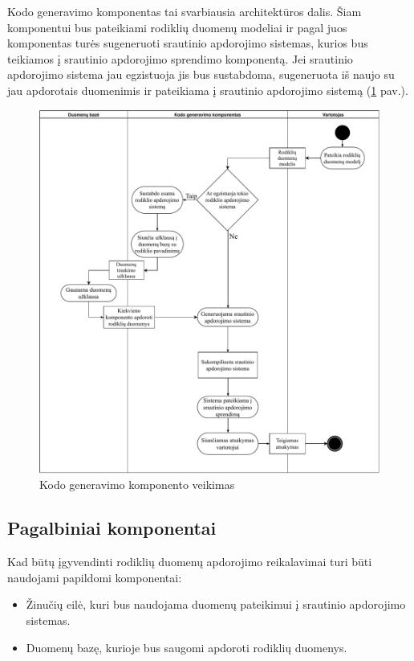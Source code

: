 \documentclass{VUMIFPSbakalaurinis}
\begin{document}
Kodo generavimo komponentas tai svarbiausia architektūros dalis. Šiam komponentui bus pateikiami rodiklių duomenų modeliai ir pagal juos komponentas turės sugeneruoti srautinio apdorojimo sistemas, kurios bus teikiamos į srautinio apdorojimo sprendimo komponentą. Jei srautinio apdorojimo sistema jau egzistuoja jis bus sustabdoma, sugeneruota iš naujo su jau apdorotais duomenimis ir pateikiama į srautinio apdorojimo sistemą (\ref{img:generation-flow} pav.).

\begin{figure}[H]
    \centering
    \includegraphics[width=1\textwidth]{img/generation-flow.pdf}
    \caption{Kodo generavimo komponento veikimas}
    \label{img:generation-flow}
\end{figure}

\subsection{Pagalbiniai komponentai}
Kad būtų įgyvendinti rodiklių duomenų apdorojimo reikalavimai turi būti naudojami papildomi komponentai:
\begin{itemize}
    \item Žinučių eilė, kuri bus naudojama duomenų pateikimui į srautinio apdorojimo sistemas.
    \item Duomenų bazę, kurioje bus saugomi apdoroti rodiklių duomenys.
\end{itemize}
\end{document}
